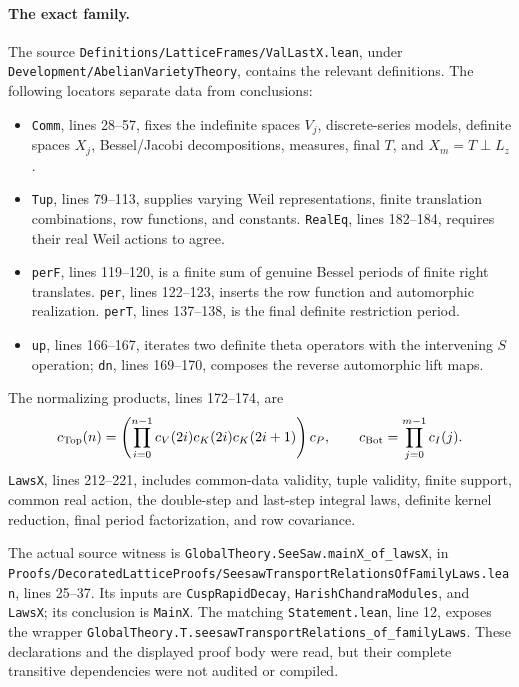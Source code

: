 \paragraph{The exact family.}
The source \texttt{Definitions/LatticeFrames/ValLastX.lean}, under
\texttt{Development/AbelianVarietyTheory}, contains the relevant definitions. The following locators separate data from conclusions:
\begin{itemize}
\item \texttt{Comm}, lines 28--57, fixes the indefinite spaces $V_j$, discrete-series models, definite spaces $X_j$, Bessel/Jacobi decompositions, measures, final $T$, and $X_m=T\perp L_z$.
\item \texttt{Tup}, lines 79--113, supplies varying Weil representations, finite translation combinations, row functions, and constants. \texttt{RealEq}, lines 182--184, requires their real Weil actions to agree.
\item \texttt{perF}, lines 119--120, is a finite sum of genuine Bessel periods of finite right translates. \texttt{per}, lines 122--123, inserts the row function and automorphic realization. \texttt{perT}, lines 137--138, is the final definite restriction period.
\item \texttt{up}, lines 166--167, iterates two definite theta operators with the intervening $S$ operation; \texttt{dn}, lines 169--170, composes the reverse automorphic lift maps.
\end{itemize}
The normalizing products, lines 172--174, are
\[
 c_{\rm Top}(n)=
 \left(\prod_{i=0}^{n-1}c_V(2i)c_K(2i)c_K(2i+1)\right)c_P,
 \qquad
 c_{\rm Bot}=\prod_{j=0}^{m-1}c_I(j).
\]
\texttt{LawsX}, lines 212--221, includes common-data validity, tuple validity, finite support, common real action, the double-step and last-step integral laws, definite kernel reduction, final period factorization, and row covariance.

The actual source witness is
\texttt{GlobalTheory.SeeSaw.mainX\_of\_lawsX}, in
\texttt{Proofs/DecoratedLatticeProofs/SeesawTransportRelationsOfFamilyLaws.lean}, lines 25--37. Its inputs are \texttt{CuspRapidDecay}, \texttt{HarishChandraModules}, and \texttt{LawsX}; its conclusion is \texttt{MainX}. The matching \texttt{Statement.lean}, line 12, exposes the wrapper
\texttt{GlobalTheory.T.seesawTransportRelations\_of\_familyLaws}.
These declarations and the displayed proof body were read, but their complete transitive dependencies were not audited or compiled.

